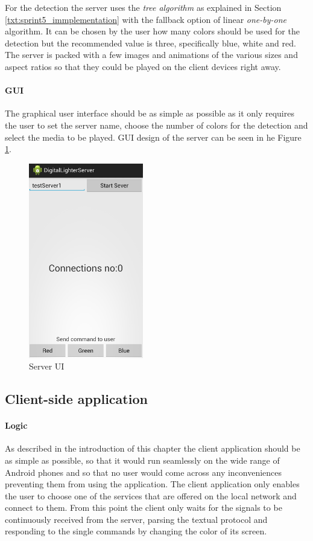 For the detection the server uses the \textit{tree algorithm} as explained in Section \ref{txt:sprint5_immplementation} with the fallback option of linear \textit{one-by-one} algorithm. It can be chosen by the user how many colors should be used for the detection but the recommended value is three, specifically blue, white and red. The server is packed with a few images and animations of the various sizes and aspect ratios so that they could be played on the client devices right away.

\paragraph{GUI}
The graphical user interface should be as simple as possible as it only requires the user to set the server name, choose the number of colors for the detection and select the media to be played. GUI design of the server can be seen in he Figure \ref{fig:Server_UI}.

\begin{figure}[H]
	\centering
		\includegraphics[width=5cm]{conclusion/server_ui.png}
	\caption{Server UI}
	\label{fig:Server_UI}
\end{figure}

\subsection{Client-side application}

\paragraph{Logic} 
As described in the introduction of this chapter the client application should be as simple as possible, so that it would run seamlessly on the wide range of Android phones and so that no user would come across any inconveniences preventing them from using the application. The client application only enables the user to choose one of the services that are offered on the local network and connect to them. From this point the client only waits for the signals to be continuously received from the server, parsing the textual protocol and responding to the single commands by changing the color of its screen.

